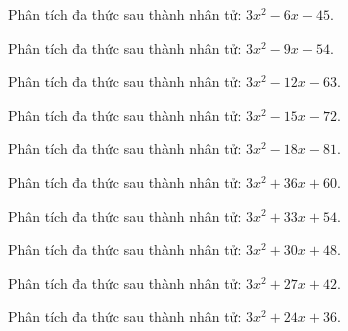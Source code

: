 \begin{bt}
	Phân tích đa thức sau thành nhân tử: $3 x^2 - 6 x - 45$.
\end{bt}
\begin{bt}
	Phân tích đa thức sau thành nhân tử: $3 x^2 - 9 x - 54$.
\end{bt}
\begin{bt}
	Phân tích đa thức sau thành nhân tử: $3 x^2 - 12 x - 63$.
\end{bt}
\begin{bt}
	Phân tích đa thức sau thành nhân tử: $3 x^2 - 15 x - 72$.
\end{bt}
\begin{bt}
	Phân tích đa thức sau thành nhân tử: $3 x^2 - 18 x - 81$.
\end{bt}
\begin{bt}
	Phân tích đa thức sau thành nhân tử: $3 x^2 + 36 x + 60$.
\end{bt}
\begin{bt}
	Phân tích đa thức sau thành nhân tử: $3 x^2 + 33 x + 54$.
\end{bt}
\begin{bt}
	Phân tích đa thức sau thành nhân tử: $3 x^2 + 30 x + 48$.
\end{bt}
\begin{bt}
	Phân tích đa thức sau thành nhân tử: $3 x^2 + 27 x + 42$.
\end{bt}
\begin{bt}
	Phân tích đa thức sau thành nhân tử: $3 x^2 + 24 x + 36$.
\end{bt}
